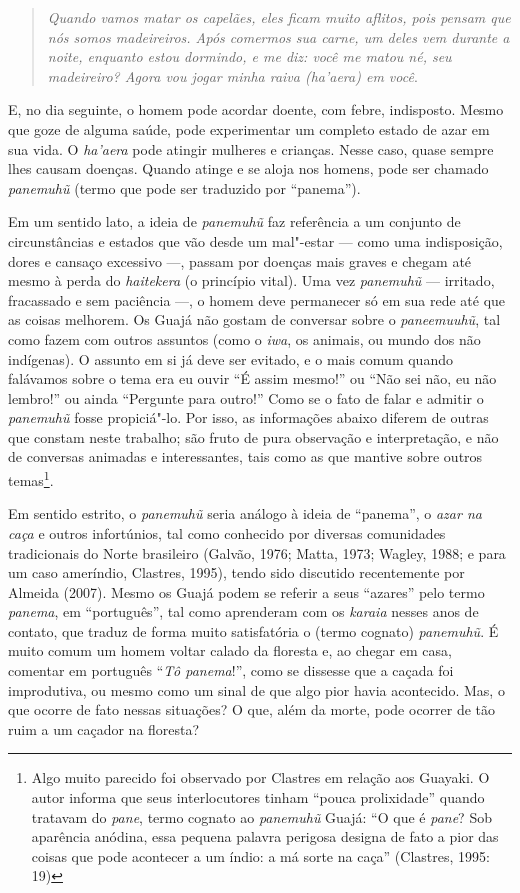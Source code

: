 \begin{quote}
\emph{Quando vamos matar os capelães, eles ficam muito aflitos, pois pensam
que nós somos madeireiros. Após comermos sua carne, um deles vem durante
a noite, enquanto estou dormindo, e me diz: \emph{você me matou né, seu
madeireiro? Agora vou jogar minha raiva (ha'aera) em você}}.
\end{quote}

E, no dia seguinte, o homem pode acordar doente, com febre, indisposto.
Mesmo que goze de alguma saúde, pode experimentar um completo estado de
azar em sua vida. O \emph{ha'aera} pode atingir mulheres e crianças.
Nesse caso, quase sempre lhes causam doenças. Quando atinge e se aloja
nos homens, pode ser chamado \emph{panemuhũ} (termo que pode ser
traduzido por ``panema'').

Em um sentido lato, a ideia de \emph{panemuhũ} faz referência a um
conjunto de circunstâncias e estados que vão desde um mal"-estar --- como
uma indisposição, dores e cansaço excessivo ---, passam por doenças mais
graves e chegam até mesmo à perda do \emph{haitekera} (o princípio
vital). Uma vez \emph{panemuhũ} --- irritado, fracassado e sem paciência
---, o homem deve permanecer só em sua rede até que as coisas melhorem. Os
Guajá não gostam de conversar sobre o \emph{paneemuuhũ}, tal como fazem
com outros assuntos (como o \emph{iwa}, os animais, ou mundo dos não
indígenas). O assunto em si já deve ser evitado, e o mais comum quando
falávamos sobre o tema era eu ouvir ``É assim mesmo!'' ou ``Não sei não, eu
não lembro!'' ou ainda ``Pergunte para outro!'' Como se o fato de falar e
admitir o \emph{panemuhũ} fosse propiciá"-lo. Por isso, as informações
abaixo diferem de outras que constam neste trabalho; são fruto de pura
observação e interpretação, e não de conversas animadas e interessantes,
tais como as que mantive sobre outros temas\footnote{Algo muito parecido
  foi observado por Clastres em relação aos Guayaki. O autor informa que
  seus interlocutores tinham ``pouca prolixidade'' quando tratavam do
  \emph{pane}, termo cognato ao \emph{panemuhũ} Guajá: ``O que é
  \emph{pane}? Sob aparência anódina, essa pequena palavra perigosa
  designa de fato a pior das coisas que pode acontecer a um índio: a má
  sorte na caça'' (Clastres, 1995: 19)}.

Em sentido estrito, o \emph{panemuhũ} seria análogo à ideia de ``panema'',
o \emph{azar na caça} e outros infortúnios, tal como conhecido por
diversas comunidades tradicionais do Norte brasileiro (Galvão, 1976;
Matta, 1973; Wagley, 1988; e para um caso ameríndio, Clastres, 1995),
tendo sido discutido recentemente por Almeida (2007). Mesmo os Guajá
podem se referir a seus ``azares'' pelo termo \emph{panema}, em
``português'', tal como aprenderam com os \emph{karaia} nesses anos de
contato, que traduz de forma muito satisfatória o (termo cognato)
\emph{panemuhũ}. É muito comum um homem voltar calado da floresta e, ao
chegar em casa, comentar em português ``\emph{Tô panema}!'', como se
dissesse que a caçada foi improdutiva, ou mesmo como um sinal de que
algo pior havia acontecido. Mas, o que ocorre de fato nessas situações?
O que, além da morte, pode ocorrer de tão ruim a um caçador na floresta?

